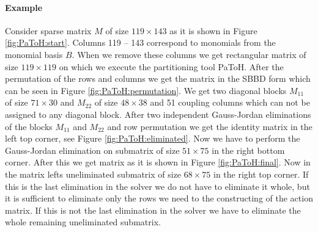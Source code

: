 \paragraph{Example}
Consider sparse matrix $M$ of size $119\times 143$ as it is shown in Figure \ref{fig:PaToH:start}. Columns 119 -- 143 correspond to monomials from the monomial basis $B$. When we remove these columns we get rectangular matrix of size $119 \times 119$ on which we execute the partitioning tool PaToH. After the permutation of the rows and columns we get the matrix in the SBBD form which can be seen in Figure \ref{fig:PaToH:permutation}. We get two diagonal blocks $M_{11}$ of size $71\times 30$ and $M_{22}$ of size $48 \times 38$ and 51 coupling columns which can not be assigned to any diagonal block. After two independent Gauss-Jordan eliminations of the blocks $M_{11}$ and $M_{22}$ and row permutation we get the identity matrix in the left top corner, see Figure \ref{fig:PaToH:eliminated}. Now we have to perform the Gauss-Jordan elimination on submatrix of size $51 \times 75$ in the right bottom corner. After this we get matrix as it is shown in Figure \ref{fig:PaToH:final}. Now in the matrix lefts uneliminated submatrix of size $68 \times 75$ in the right top corner. If this is the last elimination in the solver we do not have to eliminate it whole, but it is sufficient to eliminate only the rows we need to the constructing of the action matrix. If this is not the last elimination in the solver we have to eliminate the whole remaining uneliminated submatrix.

